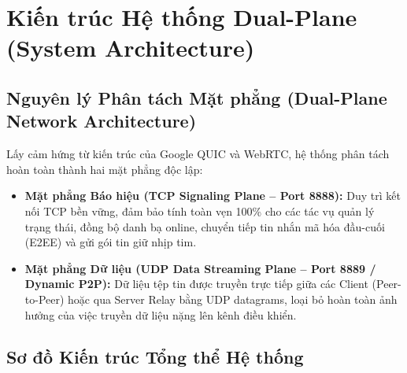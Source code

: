 \documentclass[11pt,a4paper]{article}
\begin{document}
\newpage

\section{Kiến trúc Hệ thống Dual-Plane (System Architecture)}

\subsection{Nguyên lý Phân tách Mặt phẳng (Dual-Plane Network Architecture)}
Lấy cảm hứng từ kiến trúc của Google QUIC và WebRTC, hệ thống phân tách hoàn toàn thành hai mặt phẳng độc lập:
\begin{itemize}
    \item \textbf{Mặt phẳng Báo hiệu (TCP Signaling Plane -- Port 8888):} Duy trì kết nối TCP bền vững, đảm bảo tính toàn vẹn 100\% cho các tác vụ quản lý trạng thái, đồng bộ danh bạ online, chuyển tiếp tin nhắn mã hóa đầu-cuối (E2EE) và gửi gói tin giữ nhịp tim.
    \item \textbf{Mặt phẳng Dữ liệu (UDP Data Streaming Plane -- Port 8889 / Dynamic P2P):} Dữ liệu tệp tin được truyền trực tiếp giữa các Client (Peer-to-Peer) hoặc qua Server Relay bằng UDP datagrams, loại bỏ hoàn toàn ảnh hưởng của việc truyền dữ liệu nặng lên kênh điều khiển.
\end{itemize}

\subsection{Sơ đồ Kiến trúc Tổng thể Hệ thống}
\end{document}
